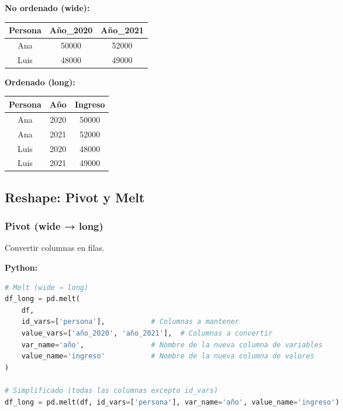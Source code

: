 \documentclass[a4paper,11pt]{article}
\begin{document}
\begin{tcolorbox}[colback=ejemplocolor!20, colframe=unidadcolor, title=Ejemplo: Datos no ordenados vs ordenados]
\textbf{No ordenado (wide):}

\begin{center}
\begin{tabular}{|c|c|c|}
\hline
Persona & Año\_2020 & Año\_2021 \\
\hline
Ana & 50000 & 52000 \\
Luis & 48000 & 49000 \\
\hline
\end{tabular}
\end{center}

\textbf{Ordenado (long):}

\begin{center}
\begin{tabular}{|c|c|c|}
\hline
Persona & Año & Ingreso \\
\hline
Ana & 2020 & 50000 \\
Ana & 2021 & 52000 \\
Luis & 2020 & 48000 \\
Luis & 2021 & 49000 \\
\hline
\end{tabular}
\end{center}
\end{tcolorbox}

\subsection{Reshape: Pivot y Melt}

\subsubsection{Pivot (wide → long)}

Convertir columnas en filas.

\textbf{Python:}
\begin{lstlisting}[language=Python]
# Melt (wide → long)
df_long = pd.melt(
    df,
    id_vars=['persona'],           # Columnas a mantener
    value_vars=['año_2020', 'año_2021'],  # Columnas a convertir
    var_name='año',                # Nombre de la nueva columna de variables
    value_name='ingreso'           # Nombre de la nueva columna de valores
)

# Simplificado (todas las columnas excepto id_vars)
df_long = pd.melt(df, id_vars=['persona'], var_name='año', value_name='ingreso')
\end{lstlisting}
\end{document}
